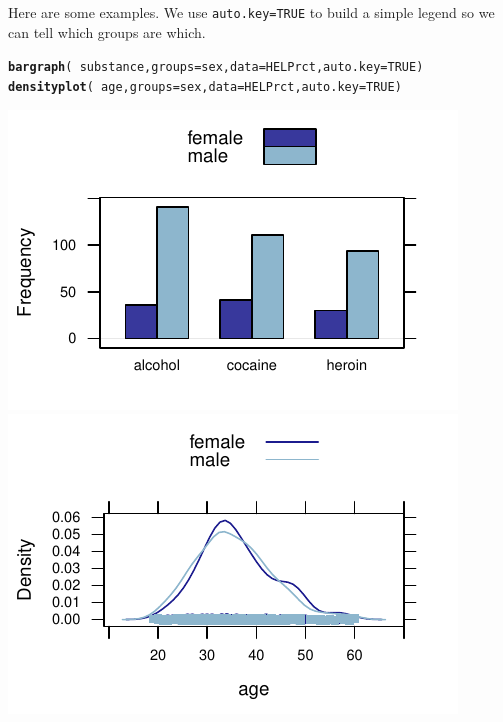 \documentclass[twoside]{book}\usepackage[]{graphicx}\usepackage[]{xcolor}
\makeatletter
\def\maxwidth{ %
  \ifdim\Gin@nat@width>\linewidth
    \linewidth
  \else
    \Gin@nat@width
  \fi
}
\newcommand{\hlnum}[1]{\textcolor[rgb]{0.686,0.059,0.569}{#1}}%
\newcommand{\hlopt}[1]{\textcolor[rgb]{0,0,0}{#1}}%
\newcommand{\hlstd}[1]{\textcolor[rgb]{0.345,0.345,0.345}{#1}}%
\newcommand{\hlkwc}[1]{\textcolor[rgb]{0.333,0.667,0.333}{#1}}%
\newcommand{\hlkwd}[1]{\textcolor[rgb]{0.737,0.353,0.396}{\textbf{#1}}}%
\newenvironment{kframe}{%
 \def\at@end@of@kframe{}%
 \ifinner\ifhmode%
  \def\at@end@of@kframe{\end{minipage}}%
  \begin{minipage}{\columnwidth}%
 \fi\fi%
 \def\FrameCommand##1{\hskip\@totalleftmargin \hskip-\fboxsep
 \colorbox{shadecolor}{##1}\hskip-\fboxsep
     \hskip-\linewidth \hskip-\@totalleftmargin \hskip\columnwidth}%
 \MakeFramed {\advance\hsize-\width
   \@totalleftmargin\z@ \linewidth\hsize
   \@setminipage}}%
 {\par\unskip\endMakeFramed%
 \at@end@of@kframe}
\newenvironment{knitrout}{}{} %
\newcommand{\argument}[1]{{\color{brown!80!black}\texttt{#1}}}
\newcounter{example}[section]
\makeatother
\begin{document}
Here are some examples.  We use \argument{auto.key=TRUE} to build 
a simple legend so we can tell which groups are which.
\begin{knitrout}
\color{fgcolor}\begin{kframe}
\begin{alltt}
\hlkwd{bargraph}\hlstd{(}\hlopt{~}\hlstd{substance,} \hlkwc{groups} \hlstd{= sex,} \hlkwc{data} \hlstd{= HELPrct,} \hlkwc{auto.key} \hlstd{=} \hlnum{TRUE}\hlstd{)}
\hlkwd{densityplot}\hlstd{(}\hlopt{~}\hlstd{age,} \hlkwc{groups} \hlstd{= sex,} \hlkwc{data} \hlstd{= HELPrct,} \hlkwc{auto.key} \hlstd{=} \hlnum{TRUE}\hlstd{)}
\end{alltt}
\end{kframe}

{\centering \includegraphics[width=\maxwidth]{figures/fig-groups-1} 
\includegraphics[width=\maxwidth]{figures/fig-groups-2} 

}



\end{knitrout}
\end{document}
